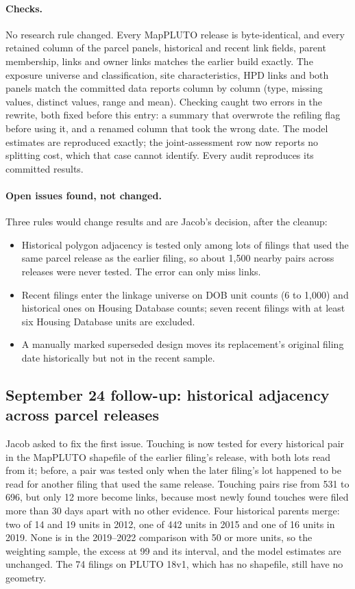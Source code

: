 \paragraph{Checks.} No research rule changed. Every MapPLUTO release is
byte-identical, and every retained column of the parcel panels, historical
and recent link fields, parent membership, links and owner links matches the
earlier build exactly. The exposure universe and classification, site
characteristics, HPD links and both panels match the committed data reports
column by column (type, missing values, distinct values, range and mean).
Checking caught two errors in the rewrite, both fixed before this entry:
a summary that overwrote the refiling flag before using it, and a renamed
column that took the wrong date. The model estimates are reproduced exactly;
the joint-assessment row now reports no splitting cost, which that case cannot
identify. Every audit reproduces its committed results.

\paragraph{Open issues found, not changed.} Three rules would change results
and are Jacob's decision, after the cleanup:
\begin{itemize}
\item Historical polygon adjacency is tested only among lots of filings that
used the same parcel release as the earlier filing, so about 1,500 nearby pairs
across releases were never tested. The error can only miss links.
\item Recent filings enter the linkage universe on DOB unit counts (6 to
1,000) and historical ones on Housing Database counts; seven recent filings
with at least six Housing Database units are excluded.
\item A manually marked superseded design moves its replacement's original
filing date historically but not in the recent sample.
\end{itemize}

\subsection*{September 24 follow-up: historical adjacency across parcel releases}

Jacob asked to fix the first issue. Touching is now tested for every
historical pair in the MapPLUTO shapefile of the earlier filing's release, with
both lots read from it; before, a pair was tested only when the later filing's
lot happened to be read for another filing that used the same release. Touching
pairs rise from 531 to 696, but only 12 more become links, because most newly
found touches were filed more than 30 days apart with no other evidence. Four
historical parents merge: two of 14 and 19 units in 2012, one of 442 units in
2015 and one of 16 units in 2019. None is in the 2019--2022 comparison with 50
or more units, so the weighting sample, the excess at 99 and its interval, and
the model estimates are unchanged. The 74 filings on PLUTO 18v1, which has no
shapefile, still have no geometry.

